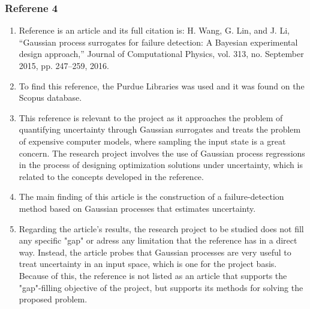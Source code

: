 \documentclass{journal}
\begin{document}
\subsubsection{Referene 4}
\begin{enumerate}
	\item Reference \cite{Wang2016} is an article and its full citation is: H. Wang, G. Lin, and J. Li, “Gaussian process surrogates for failure detection: A Bayesian experimental design approach,” Journal of Computational Physics, vol. 313, no. September 2015, pp. 247–259, 2016.
	\item To find this reference, the Purdue Libraries was used and it was found on the Scopus database.
	\item This reference is relevant to the project as it approaches the problem of quantifying uncertainty through Gaussian surrogates and treats the problem of expensive computer models, where sampling the input state is a great concern. The research project involves the use of Gaussian process regressions in the process of designing optimization solutions under uncertainty, which is related to the concepts developed in the reference.  
	\item The main finding of this article is the construction of a failure-detection method based on Gaussian processes that estimates uncertainty.
	\item Regarding the article's results, the research project to be studied does not fill any specific "gap" or adress any limitation that the reference has in a direct way. Instead, the article probes that Gaussian processes are very useful to treat uncertainty in an input space, which is one for the project basis. Because of this, the reference is not listed as an article that supports the "gap"-filling objective of the project, but supports its methods for solving the proposed problem.
\end{enumerate}
\end{document}
